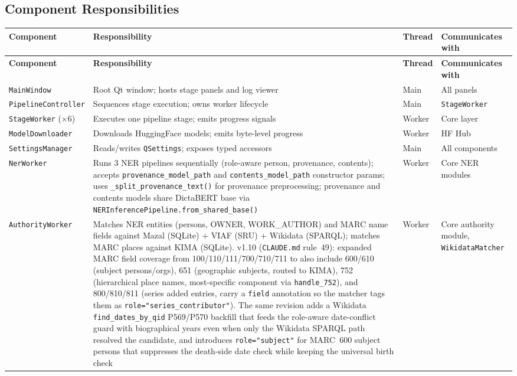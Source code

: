 \documentclass[12pt]{article}
\newcommand{\filepath}[1]{\texttt{\small #1}}
\newcommand{\code}[1]{\texttt{#1}}
\begin{document}
\subsection{Component Responsibilities}

\begin{longtable}{|l|p{4.5cm}|l|p{3cm}|}
\hline
\textbf{Component} & \textbf{Responsibility} & \textbf{Thread} & \textbf{Communicates with} \\
\hline
\endfirsthead
\hline
\textbf{Component} & \textbf{Responsibility} & \textbf{Thread} & \textbf{Communicates with} \\
\hline
\endhead
\hline
\endfoot
\code{MainWindow} & Root Qt window; hosts stage panels and log viewer & Main & All panels \\
\hline
\code{PipelineController} & Sequences stage execution; owns worker lifecycle & Main & \code{StageWorker} \\
\hline
\code{StageWorker} (×6) & Executes one pipeline stage; emits progress signals & Worker & Core layer \\
\hline
\code{ModelDownloader} & Downloads HuggingFace models; emits byte-level progress & Worker & HF Hub \\
\hline
\code{SettingsManager} & Reads/writes \code{QSettings}; exposes typed accessors & Main & All components \\
\hline
\code{NerWorker} & Runs 3 NER pipelines sequentially (role-aware person, provenance, contents); accepts \code{provenance\_model\_path} and \code{contents\_model\_path} constructor params; uses \code{\_split\_provenance\_text()} for provenance preprocessing; provenance and contents models share DictaBERT base via \code{NERInferencePipeline.from\_shared\_base()} & Worker & Core NER modules \\
\hline
\code{AuthorityWorker} & Matches NER entities (persons, OWNER, WORK\_AUTHOR) and MARC name fields against Mazal (SQLite) + VIAF (SRU) + Wikidata (SPARQL); matches MARC places against KIMA (SQLite). v1.10 (\filepath{CLAUDE.md} rule~49): expanded MARC field coverage from 100/110/111/700/710/711 to also include 600/610 (subject persons/orgs), 651 (geographic subjects, routed to KIMA), 752 (hierarchical place names, most-specific component via \code{handle\_752}), and 800/810/811 (series added entries, carry a \code{field} annotation so the matcher tags them as \code{role="series\_contributor"}). The same revision adds a Wikidata \code{find\_dates\_by\_qid} P569/P570 backfill that feeds the role-aware date-conflict guard with biographical years even when only the Wikidata SPARQL path resolved the candidate, and introduces \code{role="subject"} for MARC~600 subject persons that suppresses the death-side date check while keeping the universal birth check & Worker & Core authority module, \code{WikidataMatcher} \\

\end{longtable}
\end{document}
